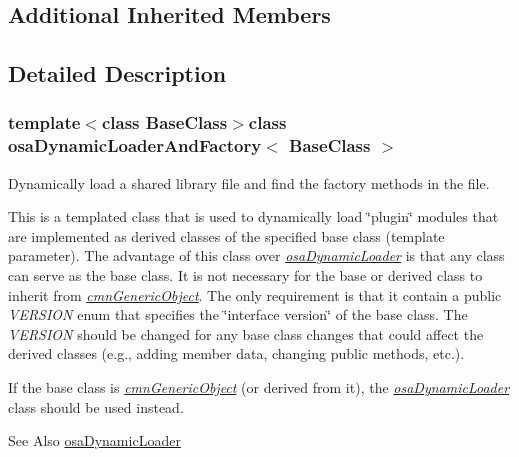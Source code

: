 \subsection*{Additional Inherited Members}


\subsection{Detailed Description}
\subsubsection*{template$<$class Base\-Class$>$class osa\-Dynamic\-Loader\-And\-Factory$<$ Base\-Class $>$}

Dynamically load a shared library file and find the factory methods in the file. 

This is a templated class that is used to dynamically load \char`\"{}plugin\char`\"{} modules that are implemented as derived classes of the specified base class (template parameter). The advantage of this class over {\itshape \hyperlink{classosa_dynamic_loader}{osa\-Dynamic\-Loader}} is that any class can serve as the base class. It is not necessary for the base or derived class to inherit from {\itshape \hyperlink{classcmn_generic_object}{cmn\-Generic\-Object}}. The only requirement is that it contain a public {\itshape V\-E\-R\-S\-I\-O\-N} enum that specifies the \char`\"{}interface version\char`\"{} of the base class. The {\itshape V\-E\-R\-S\-I\-O\-N} should be changed for any base class changes that could affect the derived classes (e.\-g., adding member data, changing public methods, etc.).

If the base class is {\itshape \hyperlink{classcmn_generic_object}{cmn\-Generic\-Object}} (or derived from it), the {\itshape \hyperlink{classosa_dynamic_loader}{osa\-Dynamic\-Loader}} class should be used instead.

\begin{DoxySeeAlso}{See Also}
\hyperlink{classosa_dynamic_loader}{osa\-Dynamic\-Loader} 
\end{DoxySeeAlso}


